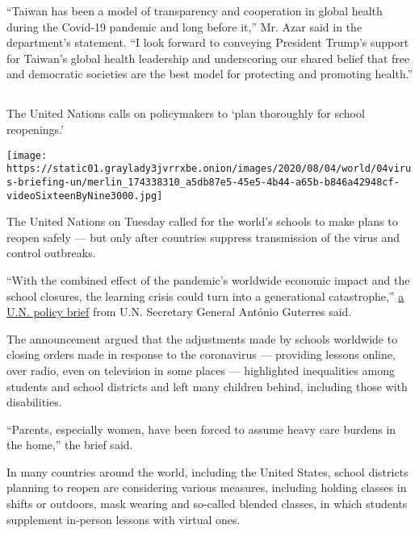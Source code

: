 ``Taiwan has been a model of transparency and cooperation in global
health during the Covid-19 pandemic and long before it,'' Mr. Azar said
in the department's statement. ``I look forward to conveying President
Trump's support for Taiwan's global health leadership and underscoring
our shared belief that free and democratic societies are the best model
for protecting and promoting health.''

\hypertarget{-4}{%
\subsection{}\label{-4}}

The United Nations calls on policymakers to `plan thoroughly for school
reopenings.'

\texttt{[image: https://static01.graylady3jvrrxbe.onion/images/2020/08/04/world/04virus-briefing-un/merlin\_174338310\_a5db87e5-45e5-4b44-a65b-b846a42948cf-videoSixteenByNine3000.jpg]}

The United Nations on Tuesday called for the world's schools to make
plans to reopen safely --- but only after countries suppress
transmission of the virus and control outbreaks.

``With the combined effect of the pandemic's worldwide economic impact
and the school closures, the learning crisis could turn into a
generational catastrophe,''
\href{https://www.un.org/sites/un2.un.org/files/sg_policy_brief_covid-19_and_education_august_2020.pdf}{a
U.N. policy brief} from U.N. Secretary General António Guterres said.

The announcement argued that the adjustments made by schools worldwide
to closing orders made in response to the coronavirus --- providing
lessons online, over radio, even on television in some places ---
highlighted inequalities among students and school districts and left
many children behind, including those with disabilities.

``Parents, especially women, have been forced to assume heavy care
burdens in the home,'' the brief said.

In many countries around the world, including the United States, school
districts planning to reopen are considering various measures, including
holding classes in shifts or outdoors, mask wearing and so-called
blended classes, in which students supplement in-person lessons with
virtual ones.

\hypertarget{-5}{%
\subsection{}\label{-5}}


